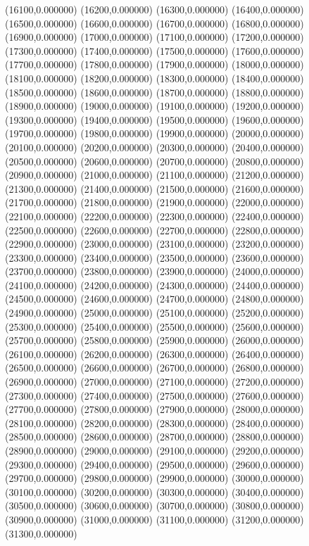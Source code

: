 (16100,0.000000)
(16200,0.000000)
(16300,0.000000)
(16400,0.000000)
(16500,0.000000)
(16600,0.000000)
(16700,0.000000)
(16800,0.000000)
(16900,0.000000)
(17000,0.000000)
(17100,0.000000)
(17200,0.000000)
(17300,0.000000)
(17400,0.000000)
(17500,0.000000)
(17600,0.000000)
(17700,0.000000)
(17800,0.000000)
(17900,0.000000)
(18000,0.000000)
(18100,0.000000)
(18200,0.000000)
(18300,0.000000)
(18400,0.000000)
(18500,0.000000)
(18600,0.000000)
(18700,0.000000)
(18800,0.000000)
(18900,0.000000)
(19000,0.000000)
(19100,0.000000)
(19200,0.000000)
(19300,0.000000)
(19400,0.000000)
(19500,0.000000)
(19600,0.000000)
(19700,0.000000)
(19800,0.000000)
(19900,0.000000)
(20000,0.000000)
(20100,0.000000)
(20200,0.000000)
(20300,0.000000)
(20400,0.000000)
(20500,0.000000)
(20600,0.000000)
(20700,0.000000)
(20800,0.000000)
(20900,0.000000)
(21000,0.000000)
(21100,0.000000)
(21200,0.000000)
(21300,0.000000)
(21400,0.000000)
(21500,0.000000)
(21600,0.000000)
(21700,0.000000)
(21800,0.000000)
(21900,0.000000)
(22000,0.000000)
(22100,0.000000)
(22200,0.000000)
(22300,0.000000)
(22400,0.000000)
(22500,0.000000)
(22600,0.000000)
(22700,0.000000)
(22800,0.000000)
(22900,0.000000)
(23000,0.000000)
(23100,0.000000)
(23200,0.000000)
(23300,0.000000)
(23400,0.000000)
(23500,0.000000)
(23600,0.000000)
(23700,0.000000)
(23800,0.000000)
(23900,0.000000)
(24000,0.000000)
(24100,0.000000)
(24200,0.000000)
(24300,0.000000)
(24400,0.000000)
(24500,0.000000)
(24600,0.000000)
(24700,0.000000)
(24800,0.000000)
(24900,0.000000)
(25000,0.000000)
(25100,0.000000)
(25200,0.000000)
(25300,0.000000)
(25400,0.000000)
(25500,0.000000)
(25600,0.000000)
(25700,0.000000)
(25800,0.000000)
(25900,0.000000)
(26000,0.000000)
(26100,0.000000)
(26200,0.000000)
(26300,0.000000)
(26400,0.000000)
(26500,0.000000)
(26600,0.000000)
(26700,0.000000)
(26800,0.000000)
(26900,0.000000)
(27000,0.000000)
(27100,0.000000)
(27200,0.000000)
(27300,0.000000)
(27400,0.000000)
(27500,0.000000)
(27600,0.000000)
(27700,0.000000)
(27800,0.000000)
(27900,0.000000)
(28000,0.000000)
(28100,0.000000)
(28200,0.000000)
(28300,0.000000)
(28400,0.000000)
(28500,0.000000)
(28600,0.000000)
(28700,0.000000)
(28800,0.000000)
(28900,0.000000)
(29000,0.000000)
(29100,0.000000)
(29200,0.000000)
(29300,0.000000)
(29400,0.000000)
(29500,0.000000)
(29600,0.000000)
(29700,0.000000)
(29800,0.000000)
(29900,0.000000)
(30000,0.000000)
(30100,0.000000)
(30200,0.000000)
(30300,0.000000)
(30400,0.000000)
(30500,0.000000)
(30600,0.000000)
(30700,0.000000)
(30800,0.000000)
(30900,0.000000)
(31000,0.000000)
(31100,0.000000)
(31200,0.000000)
(31300,0.000000)
